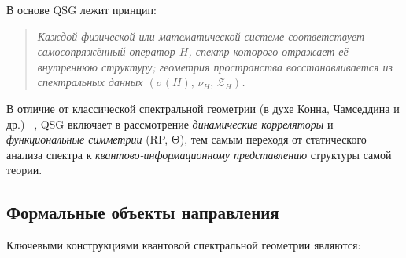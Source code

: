 \documentclass{article}
\numberwithin{equation}{section}
\theoremstyle{plain}
\theoremstyle{definition}
\theoremstyle{remark}
\begin{document}
В основе QSG лежит принцип:
\begin{quote}
\emph{Каждой физической или математической системе соответствует самосопряжённый оператор \(H\),  
спектр которого отражает её внутреннюю структуру;  
геометрия пространства восстанавливается из спектральных данных \( (\sigma(H),\, \nu_H,\, \mathcal Z_H) \).}
\end{quote}

В отличие от классической спектральной геометрии (в духе Конна, Чамседдина и др.) ~\cite{Connes1994, ChamseddineConnes1997},  
QSG включает в рассмотрение \emph{динамические корреляторы} и \emph{функциональные симметрии} (RP, Θ),  
тем самым переходя от статического анализа спектра к \emph{квантово-информационному представлению}  
структуры самой теории.

\subsection*{Формальные объекты направления}

Ключевыми конструкциями квантовой спектральной геометрии являются:
\end{document}
